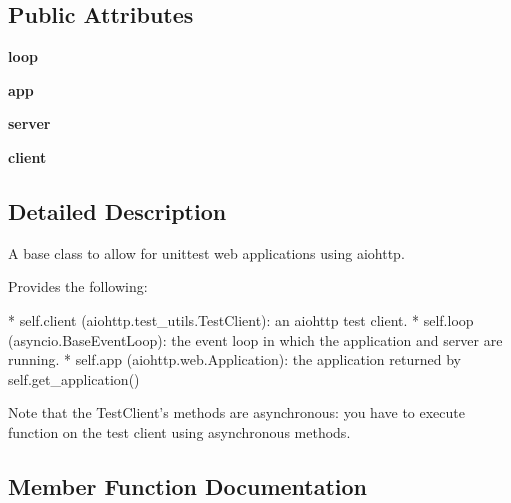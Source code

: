 \subsection*{Public Attributes}
\begin{DoxyCompactItemize}
\item 
\mbox{\label{classaiohttp_1_1test__utils_1_1_aio_h_t_t_p_test_case_a052c14a3782e5b603b1b2b8c4efb7db7}} 
{\bfseries loop}
\item 
\mbox{\label{classaiohttp_1_1test__utils_1_1_aio_h_t_t_p_test_case_a975d44423f0692a0e6021fa65b83c1a4}} 
{\bfseries app}
\item 
\mbox{\label{classaiohttp_1_1test__utils_1_1_aio_h_t_t_p_test_case_a3baea0faa5a48ffc9a95b264fe4d8cc2}} 
{\bfseries server}
\item 
\mbox{\label{classaiohttp_1_1test__utils_1_1_aio_h_t_t_p_test_case_ad5c6803988b7bf19e3cde00eccb17695}} 
{\bfseries client}
\end{DoxyCompactItemize}


\subsection{Detailed Description}
\begin{DoxyVerb}A base class to allow for unittest web applications using
aiohttp.

Provides the following:

* self.client (aiohttp.test_utils.TestClient): an aiohttp test client.
* self.loop (asyncio.BaseEventLoop): the event loop in which the
    application and server are running.
* self.app (aiohttp.web.Application): the application returned by
    self.get_application()

Note that the TestClient's methods are asynchronous: you have to
execute function on the test client using asynchronous methods.
\end{DoxyVerb}
 

\subsection{Member Function Documentation}
\mbox{\label{classaiohttp_1_1test__utils_1_1_aio_h_t_t_p_test_case_ab134b2c3dee9d110f75f19b1facb3ac8}} 
